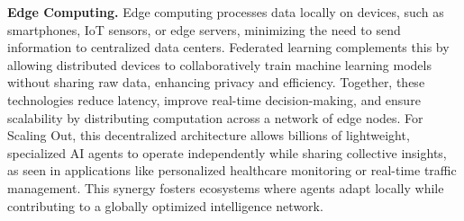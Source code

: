 \textbf{Edge Computing.}
Edge computing processes data locally on devices, such as smartphones, IoT sensors, or edge servers, minimizing the need to send information to centralized data centers. Federated learning complements this by allowing distributed devices to collaboratively train machine learning models without sharing raw data, enhancing privacy and efficiency. Together, these technologies reduce latency, improve real-time decision-making, and ensure scalability by distributing computation across a network of edge nodes. For Scaling Out, this decentralized architecture allows billions of lightweight, specialized AI agents to operate independently while sharing collective insights, as seen in applications like personalized healthcare monitoring or real-time traffic management. This synergy fosters ecosystems where agents adapt locally while contributing to a globally optimized intelligence network.


